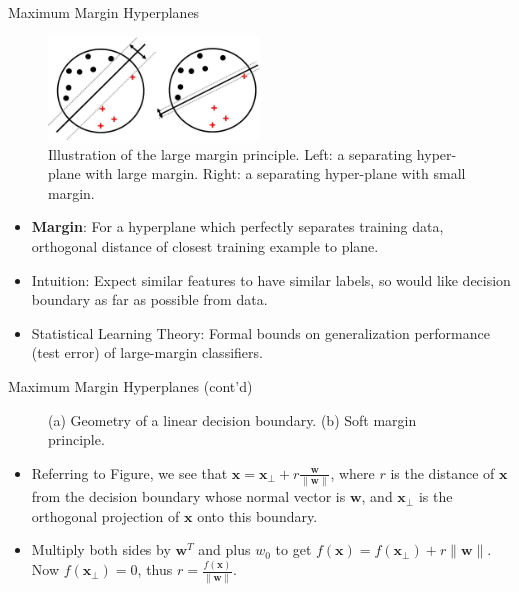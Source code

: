 \documentclass[10pt,mathserif]{beamer}
\begin{document}
\begin{frame}{Maximum Margin Hyperplanes}
\begin{figure}[h]
\centering
\includegraphics[width=0.5\textwidth]{largeMarginPrinciple2}
\caption{Illustration of the large margin principle. Left: a separating hyper-plane with large margin. Right: a separating hyper-plane with small margin.}
\end{figure}
\begin{itemize}
    \item \textbf{Margin}: For a hyperplane which perfectly separates training data, orthogonal distance of closest training example to plane.
    \item Intuition: Expect similar features to have similar labels, so would like decision boundary as far as possible from data.
    \item Statistical Learning Theory: Formal bounds on generalization performance (test error) of large-margin classifiers.
    \end{itemize}
\end{frame}

\begin{frame}{Maximum Margin Hyperplanes (cont'd)}
\begin{figure}[h]
\centering     %
{}
\caption{(a) Geometry of a linear decision boundary. (b) Soft margin principle.}
\end{figure}
\begin{itemize}
    \item Referring to Figure, we see that $\bm{x} = \bm{x}_\perp + r\frac{\bm{w}}{\|\bm{w}\|}$,
    where $r$ is the distance of $\bm{x}$ from the decision boundary whose normal vector is $\bm{w}$, and $\bm{x}_\perp$ is the orthogonal projection of $\bm{x}$ onto this boundary. 
    \item Multiply both sides by $\bm{w}^T$ and plus $w_0$ to get $f(\bm{x}) = f(\bm{\bm{x}}_\perp)+r\|\bm{w}\|$. Now $f(\bm{x}_\perp) = 0$, thus $r = \frac{f(\bm{x})}{\|\bm{w}\|}$.
\end{itemize}
\end{frame}
\end{document}

